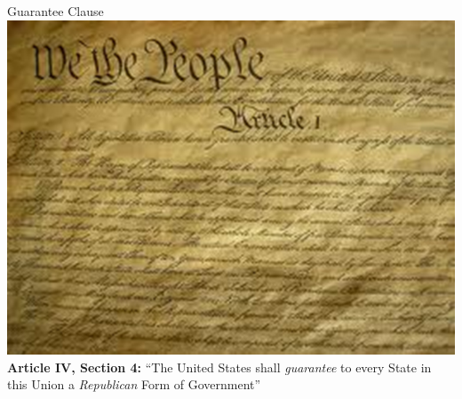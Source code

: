 
\begin{frame}{Guarantee Clause}
    \centering
    \includegraphics[height=.7\textheight]{img/constitution.png} \\
    \textbf{Article IV, Section 4:} ``The United States shall \emph{guarantee} to every State in this Union a \emph{Republican} Form of Government''
\end{frame}

